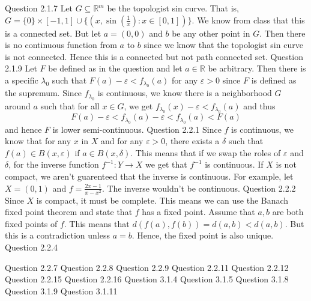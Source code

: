 \documentclass[12pt]{exam}
\begin{document}
\begin{questions}
\question Question 2.1.7\newline
Let $G \subseteq \mathbb{R}^m$ be the topologist sin curve. That is, $G = \{0\} \times [-1,1] \cup \{(x, \sin(\frac{1}{x}): x\in [0, 1])\}$. We know from class that this is a connected set. But let $a = (0,0)$ and $b$ be any other point in $G$. Then there is no continuous function from $a$ to $b$ since we know that the topologist sin curve is not connected. Hence this is a connected but not path connected set. 
\question Question 2.1.9\newline
Let $F$ be defined as in the question and let $a\in \mathbb{R}$ be arbitrary. Then there is a specific $\lambda_0$ such that $F(a) - \varepsilon < f_{\lambda_0}(a)$ for any $\varepsilon > 0$ since $F$ is defined as the supremum. Since $f_{\lambda_0}$ is continuous, we know there is a neighborhood $G$ around $a$ such that for all $x \in G$, we get $f_{\lambda_0}(x) - \varepsilon < f_{\lambda_0}(a)$ and thus \[F(a) -\varepsilon< f_{\lambda_0}(a) - \varepsilon < f_{\lambda_0}(a) < F(a)\] and hence $F$ is lower semi-continuous.
\question Question 2.2.1 \newline
Since $f$ is continuous, we know that for any $x$ in $X$ and for any $\varepsilon > 0$, there exists a $\delta$ such that $f(a) \in B(x, \varepsilon)$ if $a \in B(x, \delta)$. This means that if we swap the roles of $\varepsilon$ and $\delta$, for the inverse function $f^{-1}: Y \rightarrow X$ we get that $f^{-1}$ is continuous. If $X$ is not compact, we aren't guarenteed that the inverse is continuous. For example, let $X = (0,1)$ and $f = \frac{2x-1}{x-x^2}$. The inverse wouldn't be continuous.
\question Question 2.2.2\newline
Since $X$ is compact, it must be complete. This means we can use the Banach fixed point theorem and state that $f$ has a fixed point. Assume that $a,b$ are both fixed points of $f$. This means that $d(f(a) , f(b)) = d(a,b) < d(a,b)$. But this is a contradiction unless $a = b$. Hence, the fixed point is also unique. 
\question Question 2.2.4
\question Question 2.2.7
\question Question 2.2.8
\question Question 2.2.9
\question Question 2.2.11
\question Question 2.2.12
\question Question 2.2.15
\question Question 2.2.16
\question Question 3.1.4
\question Question 3.1.5
\question Question 3.1.8
\question Question 3.1.9
\question Question 3.1.11
\end{questions}
\end{document}
